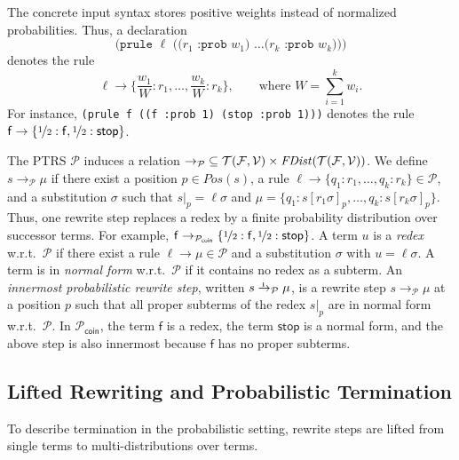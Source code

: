 The concrete input syntax stores positive weights instead of normalized probabilities.
Thus, a declaration
\[
  \texttt{(prule }\ell\texttt{ ((}r_1\texttt{ :prob }w_1\texttt{) \ldots (}r_k\texttt{ :prob }w_k\texttt{)))}
\]
denotes the rule
\[
  \ell \to \Big\{\frac{w_1}{W}:r_1,\ldots,\frac{w_k}{W}:r_k\Big\},
  \qquad\text{where } W = \sum_{i=1}^{k} w_i.
\]
For instance, \texttt{(prule f ((f :prob 1) (stop :prob 1)))} denotes the rule
$\mathsf{f} \to \{\nicefrac{1}{2}:\mathsf{f},\nicefrac{1}{2}:\mathsf{stop}\}$.

The PTRS $\mathcal{P}$ induces a relation
${\to_\mathcal{P}} \subseteq \mathcal{T}(\mathcal{F},\mathcal{V}) \times \mathit{FDist}(\mathcal{T}(\mathcal{F},\mathcal{V}))$.
We define $s \to_\mathcal{P} \mu$ if there exist a position $p \in \mathit{Pos}(s)$,
a rule $\ell \to \{q_1:r_1,\ldots,q_k:r_k\} \in \mathcal{P}$, and a substitution $\sigma$
such that $s|_p = \ell\sigma$ and $\mu = \{q_1:s[r_1\sigma]_p,\ldots,q_k:s[r_k\sigma]_p\}$.
Thus, one rewrite step replaces a redex by a finite probability distribution over successor terms.
For example, $\mathsf{f} \to_{\mathcal{P}_{\mathsf{coin}}} \{\nicefrac{1}{2}:\mathsf{f},\nicefrac{1}{2}:\mathsf{stop}\}$.
A term $u$ is a \emph{redex} w.r.t.\ $\mathcal{P}$ if there exist a rule $\ell \to \mu \in \mathcal{P}$ and a substitution $\sigma$ with $u = \ell\sigma$.
A term is in \emph{normal form} w.r.t.\ $\mathcal{P}$ if it contains no redex as a subterm.
An \emph{innermost probabilistic rewrite step}, written $s \ito_\mathcal{P} \mu$, is a rewrite step $s \to_\mathcal{P} \mu$ at a position $p$
such that all proper subterms of the redex $s|_p$ are in normal form w.r.t.\ $\mathcal{P}$.
In $\mathcal{P}_{\mathsf{coin}}$, the term $\mathsf{f}$ is a redex, the term $\mathsf{stop}$ is a normal form,
and the above step is also innermost because $\mathsf{f}$ has no proper subterms.

\subsection{Lifted Rewriting and Probabilistic Termination}

To describe termination in the probabilistic setting, 
rewrite steps are lifted from single terms to
multi-distributions over terms.

